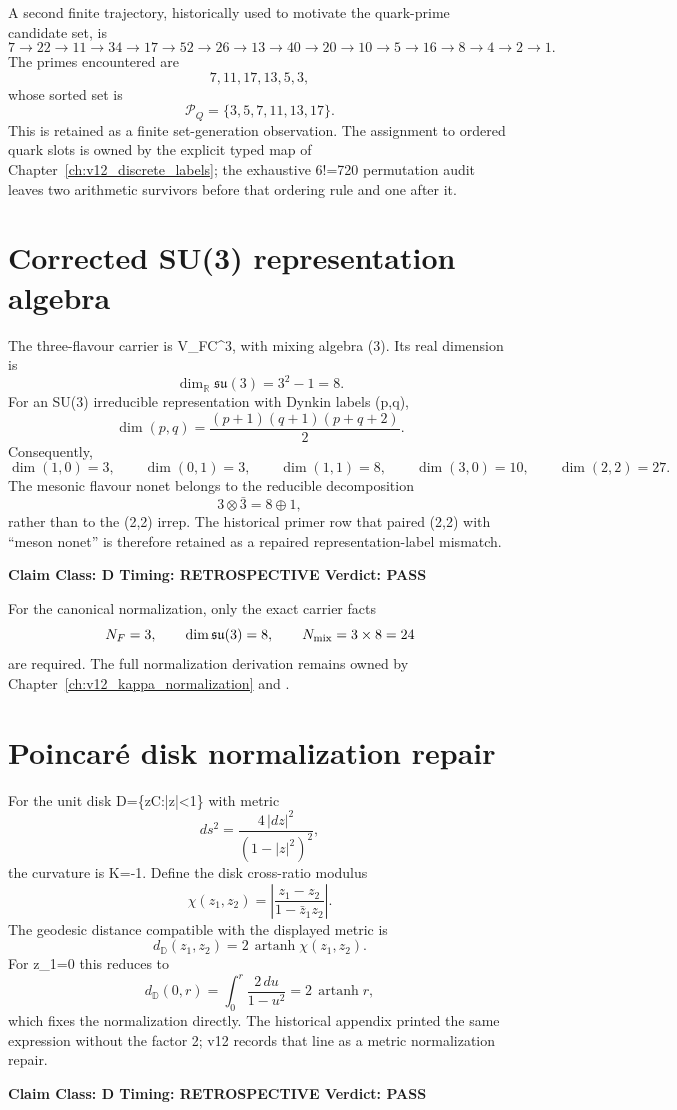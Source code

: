 \documentclass[11pt,a4paper,twoside]{book}
\def\({}%
\def\){}%
\theoremstyle{definition}
\newcommand{\vTwelveStatus}[3]{\par\noindent\textbf{Claim Class: #1 \quad Timing: #2 \quad Verdict: #3}\par}
\begin{document}
A second finite trajectory, historically used to motivate the quark-prime
candidate set, is
\[
7\to22\to11\to34\to17\to52\to26\to13\to40\to20\to10\to5
\to16\to8\to4\to2\to1.
\]
The primes encountered are
\[
7,11,17,13,5,3,
\]
whose sorted set is
\[
\mathcal P_Q=\{3,5,7,11,13,17\}.
\]
This is retained as a finite set-generation observation.  The assignment to
ordered quark slots is owned by the explicit typed map of
Chapter~\ref{ch:v12_discrete_labels}; the exhaustive \(6!=720\) permutation
audit leaves two arithmetic survivors before that ordering rule and one after
it.

\section{Corrected \(SU(3)\) representation algebra}

The three-flavour carrier is \(V_F\cong\mathbb C^3\), with mixing algebra
\((3)\).  Its real dimension is
\[
\dim_{\mathbb R}\mathfrak{su}(3)=3^2-1=8.
\]
For an \(SU(3)\) irreducible representation with Dynkin labels \((p,q)\),
\[
\boxed{
\dim(p,q)=\frac{(p+1)(q+1)(p+q+2)}{2}.
}
\]
Consequently,
\[
\dim(1,0)=3,\qquad
\dim(0,1)=3,\qquad
\dim(1,1)=8,\qquad
\dim(3,0)=10,\qquad
\dim(2,2)=27.
\]
The mesonic flavour nonet belongs to the reducible decomposition
\[
\boxed{
3\otimes\bar3=8\oplus1,
}
\]
rather than to the \((2,2)\) irrep.  The historical primer row that paired
\((2,2)\) with ``meson nonet'' is therefore retained as a repaired
representation-label mismatch.
\vTwelveStatus{D}{RETROSPECTIVE}{PASS}

For the canonical \(\kappa\) normalization, only the exact carrier facts
\[
N_F=3,\qquad \dim\mathfrak{su}(3)=8,\qquad N_{\rm mix}=3\times8=24
\]
are required.  The full normalization derivation remains owned by
Chapter~\ref{ch:v12_kappa_normalization} and
.

\section{Poincar\'e disk normalization repair}

For the unit disk \(\mathbb D=\{z\in\mathbb C:|z|<1\}\) with metric
\[
ds^2=\frac{4\,|dz|^2}{(1-|z|^2)^2},
\]
the curvature is \(K=-1\).  Define the disk cross-ratio modulus
\[
\chi(z_1,z_2)=
\left|
\frac{z_1-z_2}{1-\bar z_1z_2}
\right|.
\]
The geodesic distance compatible with the displayed metric is
\[
\boxed{
d_{\mathbb D}(z_1,z_2)
=2\,\operatorname{artanh}\chi(z_1,z_2).
}
\]
For \(z_1=0\) this reduces to
\[
d_{\mathbb D}(0,r)=\int_0^r\frac{2\,du}{1-u^2}
=2\,\operatorname{artanh}r,
\]
which fixes the normalization directly.  The historical appendix printed the
same expression without the factor \(2\); v12 records that line as a metric
normalization repair.
\vTwelveStatus{D}{RETROSPECTIVE}{PASS}
\end{document}
